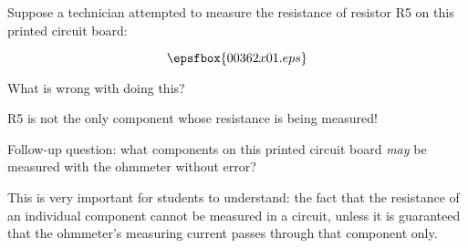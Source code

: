 

Suppose a technician attempted to measure the resistance of resistor R5 on this printed circuit board:

$$\epsfbox{00362x01.eps}$$

What is wrong with doing this?







R5 is not the only component whose resistance is being measured!

\vskip 10pt

Follow-up question: what components on this printed circuit board {\it may} be measured with the ohmmeter without error?







This is very important for students to understand: the fact that the resistance of an individual component cannot be measured in a circuit, unless it is guaranteed that the ohmmeter's measuring current passes through that component only.




